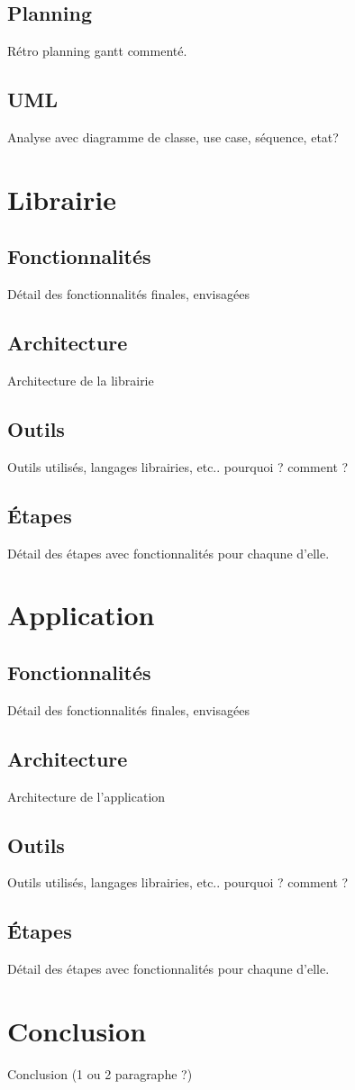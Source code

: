 \documentclass{article}
\begin{document}
		\subsection{Planning}
			Rétro planning gantt commenté.
		\subsection{UML}
			Analyse avec diagramme de classe, use case, séquence, etat?
	\section{Librairie}
		\subsection{Fonctionnalités}
			Détail des fonctionnalités finales, envisagées
		\subsection{Architecture}
			Architecture de la librairie
		\subsection{Outils}
			Outils utilisés, langages librairies, etc.. pourquoi ? comment ?
		\subsection{Étapes}
			Détail des étapes avec fonctionnalités pour chaqune d'elle.
	\section{Application}
		\subsection{Fonctionnalités}
			Détail des fonctionnalités finales, envisagées
		\subsection{Architecture}
			Architecture de l'application
		\subsection{Outils}
			Outils utilisés, langages librairies, etc.. pourquoi ? comment ?
		\subsection{Étapes}
			Détail des étapes avec fonctionnalités pour chaqune d'elle.
	\section{Conclusion}	
		Conclusion (1 ou 2 paragraphe ?)
	
\end{document}
